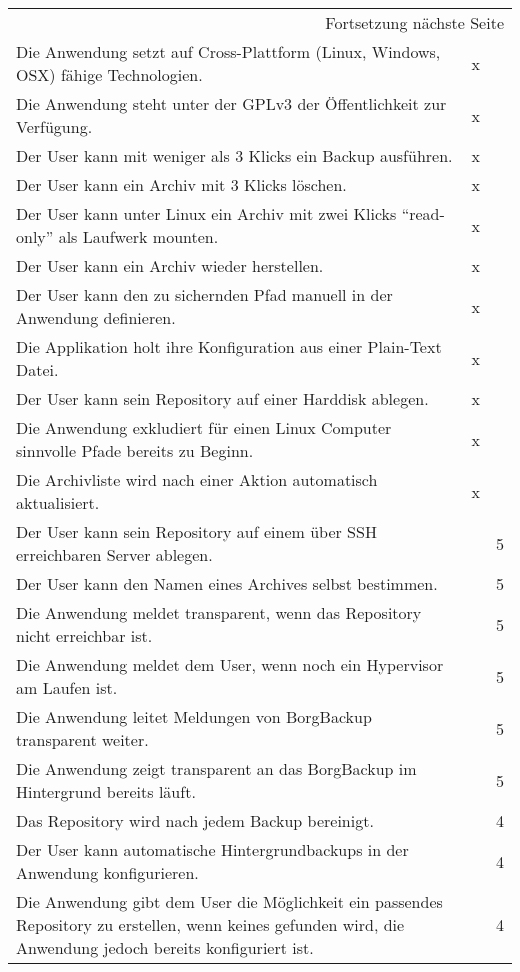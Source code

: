 \begin{longtable}{|p{9cm}|p{1.5cm}|p{2cm}|}
\hline
\endhead
\hline\multicolumn{3}{r}{Fortsetzung nächste Seite} \\
\endfoot
\endlastfoot
\hline
Die Anwendung setzt auf Cross-Plattform (Linux, Windows, OSX) fähige Technologien. & x & \\
\hline
Die Anwendung steht unter der GPLv3 der Öffentlichkeit zur Verfügung. & x & \\
\hline
Der User kann mit weniger als 3 Klicks ein Backup ausführen. & x & \\
\hline
Der User kann ein Archiv mit 3 Klicks löschen. & x & \\
\hline
Der User kann unter Linux ein Archiv mit zwei Klicks "`read-only"' als Laufwerk mounten. & x & \\
\hline
Der User kann ein Archiv wieder herstellen. & x & \\
\hline
Der User kann den zu sichernden Pfad manuell in der Anwendung definieren. & x & \\
\hline
Die Applikation holt ihre Konfiguration aus einer Plain-Text Datei. & x & \\
\hline
Der User kann sein Repository auf einer Harddisk ablegen. & x & \\
\hline
Die Anwendung exkludiert für einen Linux Computer sinnvolle Pfade bereits zu Beginn. & x & \\
\hline
Die Archivliste wird nach einer Aktion automatisch aktualisiert. & x & \\
\hline
Der User kann sein Repository auf einem über SSH erreichbaren Server ablegen. &  & 5\\
\hline
Der User kann den Namen eines Archives selbst bestimmen. &  & 5\\
\hline
Die Anwendung meldet transparent, wenn das Repository nicht erreichbar ist. &  & 5\\
\hline
Die Anwendung meldet dem User, wenn noch ein Hypervisor am Laufen ist. &  & 5\\
\hline
Die Anwendung leitet Meldungen von BorgBackup transparent weiter. &  & 5\\
\hline
Die Anwendung zeigt transparent an das BorgBackup im Hintergrund bereits läuft. &  & 5\\
\hline
Das Repository wird nach jedem Backup bereinigt. &  & 4\\
\hline
Der User kann automatische Hintergrundbackups in der Anwendung konfigurieren. &  & 4\\
\hline
Die Anwendung gibt dem User die Möglichkeit ein passendes Repository zu erstellen, wenn keines gefunden wird, die Anwendung jedoch bereits konfiguriert ist. &  & 4\\

\end{longtable}
